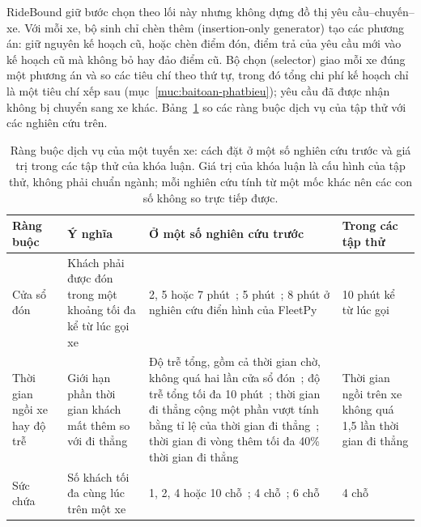 RideBound giữ bước chọn theo lối này nhưng không dựng đồ thị yêu cầu--chuyến--xe. Với mỗi xe, bộ sinh chỉ chèn thêm
(insertion-only generator) tạo các phương án: giữ nguyên kế hoạch cũ, hoặc chèn điểm đón, điểm trả của yêu cầu mới
vào kế hoạch cũ mà không bỏ hay đảo điểm cũ. Bộ chọn (selector) giao mỗi xe đúng một phương án và so các tiêu chí
theo thứ tự, trong đó tổng chi phí kế hoạch chỉ là một tiêu chí xếp sau (mục~\ref{muc:baitoan-phatbieu}); yêu cầu đã
được nhận không bị chuyển sang xe khác. Bảng~\ref{bang:c2-dichvu} so các ràng buộc dịch vụ của tập thử với các nghiên
cứu trên.

\begin{table}[htbp]
\centering
\caption[Ràng buộc dịch vụ ở nghiên cứu trước và trong tập thử]{Ràng buộc dịch vụ của một tuyến xe: cách đặt ở một số nghiên cứu trước và giá trị trong các tập thử của
khóa luận. Giá trị của khóa luận là cấu hình của tập thử, không phải chuẩn ngành; mỗi nghiên cứu tính từ một mốc
khác nên các con số không so trực tiếp được.}
\label{bang:c2-dichvu}
\small
\begin{tabular}{@{}p{2.4cm}p{3.4cm}p{5.7cm}p{3.1cm}@{}}
\toprule
\textbf{Ràng buộc} & \textbf{Ý nghĩa} & \textbf{Ở một số nghiên cứu trước} & \textbf{Trong các tập thử}\\
\midrule
Cửa sổ đón & Khách phải được đón trong một khoảng tối đa kể từ lúc gọi xe & 2, 5 hoặc 7
phút~\cite{alonsomora2017}; 5 phút~\cite{fielbaum2020,elmi2026}; 8 phút ở nghiên cứu điển hình của
FleetPy~\cite{engelhardt2026} & 10 phút kể từ lúc gọi\\
Thời gian ngồi xe hay độ trễ & Giới hạn phần thời gian khách mất thêm so với đi thẳng & Độ trễ tổng, gồm cả thời gian
chờ, không quá hai lần cửa sổ đón~\cite{alonsomora2017}; độ trễ tổng tối đa 10 phút~\cite{fielbaum2020,elmi2026};
thời gian đi thẳng cộng một phần vượt tính bằng tỉ lệ của thời gian đi thẳng~\cite{molenbruch2017}; thời gian đi vòng thêm tối đa
40\% thời gian đi thẳng~\cite{engelhardt2026} & Thời gian ngồi trên xe không quá 1,5 lần thời gian đi thẳng\\
Sức chứa & Số khách tối đa cùng lúc trên một xe & 1, 2, 4 hoặc 10 chỗ~\cite{alonsomora2017}; 4
chỗ~\cite{engelhardt2026}; 6 chỗ~\cite{schulz2026} & 4 chỗ\\
\bottomrule
\end{tabular}
\end{table}

